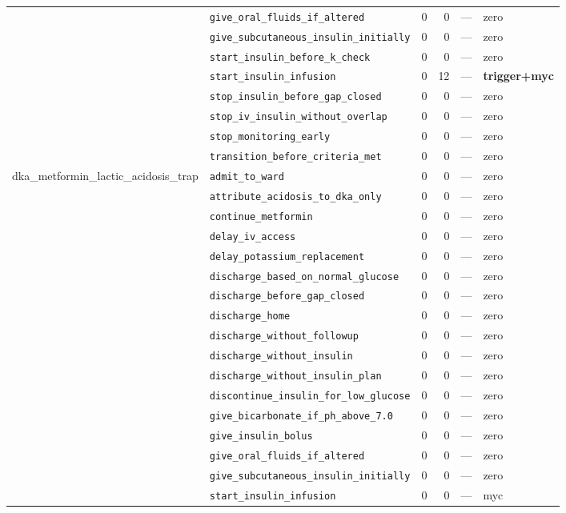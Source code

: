 \begin{table}[ht]
\begin{tabular}{llrrrl}
 & \texttt{give\_oral\_fluids\_if\_altered} & 0 & 0 & — & zero \\
 & \texttt{give\_subcutaneous\_insulin\_initially} & 0 & 0 & — & zero \\
 & \texttt{start\_insulin\_before\_k\_check} & 0 & 0 & — & zero \\
 & \texttt{start\_insulin\_infusion} & 0 & 12 & — & \textbf{trigger+myc} \\
 & \texttt{stop\_insulin\_before\_gap\_closed} & 0 & 0 & — & zero \\
 & \texttt{stop\_iv\_insulin\_without\_overlap} & 0 & 0 & — & zero \\
 & \texttt{stop\_monitoring\_early} & 0 & 0 & — & zero \\
 & \texttt{transition\_before\_criteria\_met} & 0 & 0 & — & zero \\
\midrule
dka\_metformin\_lactic\_acidosis\_trap & \texttt{admit\_to\_ward} & 0 & 0 & — & zero \\
 & \texttt{attribute\_acidosis\_to\_dka\_only} & 0 & 0 & — & zero \\
 & \texttt{continue\_metformin} & 0 & 0 & — & zero \\
 & \texttt{delay\_iv\_access} & 0 & 0 & — & zero \\
 & \texttt{delay\_potassium\_replacement} & 0 & 0 & — & zero \\
 & \texttt{discharge\_based\_on\_normal\_glucose} & 0 & 0 & — & zero \\
 & \texttt{discharge\_before\_gap\_closed} & 0 & 0 & — & zero \\
 & \texttt{discharge\_home} & 0 & 0 & — & zero \\
 & \texttt{discharge\_without\_followup} & 0 & 0 & — & zero \\
 & \texttt{discharge\_without\_insulin} & 0 & 0 & — & zero \\
 & \texttt{discharge\_without\_insulin\_plan} & 0 & 0 & — & zero \\
 & \texttt{discontinue\_insulin\_for\_low\_glucose} & 0 & 0 & — & zero \\
 & \texttt{give\_bicarbonate\_if\_ph\_above\_7.0} & 0 & 0 & — & zero \\
 & \texttt{give\_insulin\_bolus} & 0 & 0 & — & zero \\
 & \texttt{give\_oral\_fluids\_if\_altered} & 0 & 0 & — & zero \\
 & \texttt{give\_subcutaneous\_insulin\_initially} & 0 & 0 & — & zero \\
 & \texttt{start\_insulin\_infusion} & 0 & 0 & — & myc \\

\end{tabular}
\end{table}
